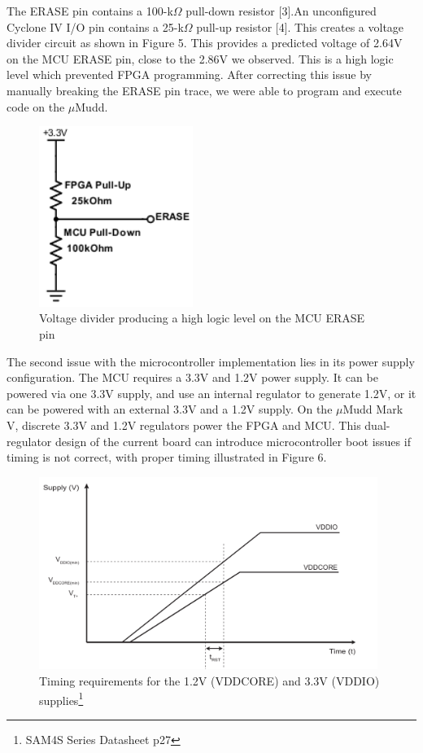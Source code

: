 \documentclass[12pt]{article}
\begin{document}
The ERASE pin contains a 100-k$\Omega$ pull-down resistor [3].An unconfigured Cyclone IV I/O pin contains a 25-k$\Omega$ pull-up resistor [4]. This creates a voltage divider circuit as shown in Figure 5. This provides a predicted voltage of 2.64V on the MCU ERASE pin, close to the 2.86V we observed. This is a high logic level which prevented FPGA programming. After correcting this issue by manually breaking the ERASE pin trace, we were able to program and execute code on the $\mu$Mudd.

\begin{figure}[h]
    \label{eraseerrorschematic}
    \begin{center}
    	\includegraphics[width=5cm]{resistor_divider.png}
    	\caption{Voltage divider producing a high logic level on the MCU ERASE pin}
    \end{center}
\end{figure}

The second issue with the microcontroller implementation lies in its power supply configuration. The MCU requires a 3.3V and 1.2V power supply. It can be powered via one 3.3V supply, and use an internal regulator to generate 1.2V, or it can be powered with an external 3.3V and a 1.2V supply. On the $\mu$Mudd Mark V, discrete 3.3V and 1.2V regulators power the FPGA and MCU. This dual-regulator design of the current board can introduce microcontroller boot issues if timing is not correct, with proper timing illustrated in Figure 6.

\begin{figure}[h]
    \label{vddtiming}
	\begin{center}
	\includegraphics[width=11cm]{power_timing.png}
	\caption{Timing requirements for the 1.2V (VDDCORE) and 3.3V (VDDIO) supplies\footnote{SAM4S Series Datasheet p27}}	
	\end{center}
\end{figure}
\end{document}
